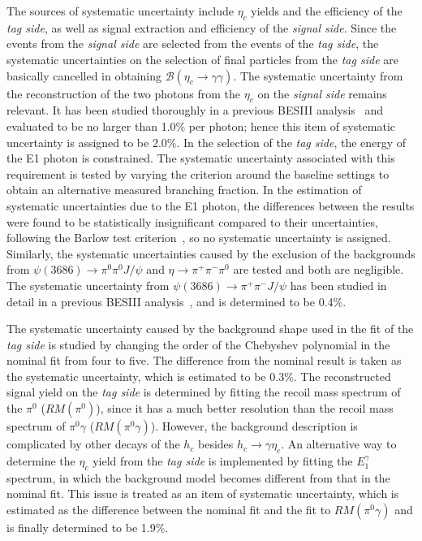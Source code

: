 \documentclass[twocolumn,showpacs,aps,prl]{revtex4-2}
\begin{document}
The sources of systematic uncertainty include $\eta_c$ yields and the efficiency of the \textit{tag side}, as well as signal extraction and efficiency of the \textit{signal side}. Since the events from the \textit{signal side} are selected from the events of the \textit{tag side}, the systematic uncertainties on the selection of final particles from the \textit{tag side} are basically cancelled in obtaining $\mathcal{B}(\eta_c \to \gamma \gamma)$. The systematic uncertainty from the reconstruction of the two photons from the $\eta_c$ on the \textit{signal side} remains relevant.  It has been studied thoroughly in a previous BESIII analysis~\cite{BESIII:2024hdv} and evaluated to be no larger than 1.0\% per photon; hence this item of systematic uncertainty is assigned to be 2.0\%. In the selection of the \textit{tag side}, the energy of the E1 photon is constrained. The systematic uncertainty associated with this requirement is tested by varying the criterion around the baseline settings to obtain an alternative measured branching fraction. In the estimation of systematic uncertainties due to the E1 photon, the differences between the results were found to be statistically insignificant compared to their uncertainties, following the Barlow test criterion~\cite{Barlow:2002yb}, so no systematic uncertainty is assigned. Similarly, the systematic uncertainties caused by the exclusion of the backgrounds from $\psi(3686) \to \pi^0 \pi^0 J/\psi$ and $\eta \to \pi^+ \pi^- \pi^0$ are tested and both are negligible. The systematic uncertainty from $\psi(3686) \to \pi^+ \pi^- J/\psi$ has been studied in detail in a previous BESIII analysis~\cite{BESIII:2022jde}, and is determined to be 0.4\%.

The systematic uncertainty caused by the background shape used in the fit of the \textit{tag side} is studied by changing the order of the Chebyshev polynomial in the nominal fit from four to five. The difference from the nominal result is taken as the systematic uncertainty, which is estimated to be 0.3\%. The reconstructed signal yield on the \textit{tag side} is determined by fitting the recoil mass spectrum of the $\pi^0$ ($RM(\pi^0)$), since it has a much better resolution than the recoil mass spectrum of $\pi^0 \gamma$ ($RM(\pi^0\gamma)$). However, the background description is complicated by other decays of the $h_c$ besides $h_c \to \gamma \eta_c$. An alternative way to determine the $\eta_c$ yield from the \textit{tag side} is implemented by fitting the $E_1^{\gamma}$ spectrum, in which the background model becomes different from that in the nominal fit.  This issue is treated as an item of systematic uncertainty, which is estimated as the difference between the nominal fit and the fit to $RM(\pi^0 \gamma)$ and is finally determined to be 1.9\%.
\end{document}
